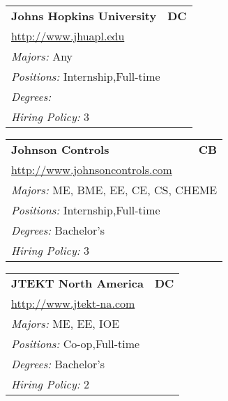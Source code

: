 \documentclass[twoside]{article}
\begin{document}
\begin{center}
\begin{multicols}{3}
\begin{FlushLeft}
\begin{minipage}{.9\columnwidth}
\end{minipage}
 
\begin{minipage}{.9\columnwidth}\begin{tabularx}{.95\columnwidth}{Xr}
                 {\Large\bf Johns Hopkins University} & {\Large\bf DC}\\
    \multicolumn{2}{p{.95\columnwidth}}{\url{http://www.jhuapl.edu}}\\
    \multicolumn{2}{p{.95\columnwidth}}{\emph{Majors:} Any}\\
    \multicolumn{2}{p{.95\columnwidth}}{\emph{Positions:} Internship,Full-time}\\
    \multicolumn{2}{p{.95\columnwidth}}{\emph{Degrees:} }\\
    \multicolumn{2}{p{.95\columnwidth}}{\emph{Hiring Policy:} 3}\\
    \end{tabularx}
    
\end{minipage}
 
\begin{minipage}{.9\columnwidth}\begin{tabularx}{.95\columnwidth}{Xr}
                 {\Large\bf Johnson Controls} & {\Large\bf CB}\\
    \multicolumn{2}{p{.95\columnwidth}}{\url{http://www.johnsoncontrols.com}}\\
    \multicolumn{2}{p{.95\columnwidth}}{\emph{Majors:} ME, BME, EE, CE, CS, CHEME}\\
    \multicolumn{2}{p{.95\columnwidth}}{\emph{Positions:} Internship,Full-time}\\
    \multicolumn{2}{p{.95\columnwidth}}{\emph{Degrees:} Bachelor's}\\
    \multicolumn{2}{p{.95\columnwidth}}{\emph{Hiring Policy:} 3}\\
    \end{tabularx}
    
\end{minipage}
 
\begin{minipage}{.9\columnwidth}\begin{tabularx}{.95\columnwidth}{Xr}
                 {\Large\bf JTEKT North America} & {\Large\bf DC}\\
    \multicolumn{2}{p{.95\columnwidth}}{\url{http://www.jtekt-na.com}}\\
    \multicolumn{2}{p{.95\columnwidth}}{\emph{Majors:} ME, EE, IOE}\\
    \multicolumn{2}{p{.95\columnwidth}}{\emph{Positions:} Co-op,Full-time}\\
    \multicolumn{2}{p{.95\columnwidth}}{\emph{Degrees:} Bachelor's}\\
    \multicolumn{2}{p{.95\columnwidth}}{\emph{Hiring Policy:} 2}\\
    \end{tabularx}
    

\end{minipage}
\end{FlushLeft}
\end{multicols}
\end{center}
\end{document}

